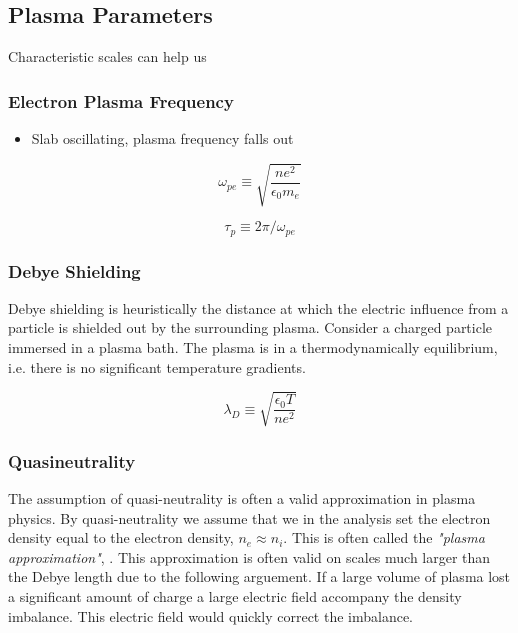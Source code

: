     \subsection{Plasma Parameters}
		\label{sec:parameters}

		Characteristic scales can help us



		\subsubsection{Electron Plasma Frequency}

		\begin{itemize}
			\item Slab oscillating, plasma frequency falls out
		\end{itemize}

		\begin{equation}
			\omega_{pe} \equiv \sqrt{\frac{ne^2}{\epsilon_0 m_e}}
		\end{equation}

		\begin{equation}
			\tau_p \equiv 2\pi/\omega_{pe}
		\end{equation}

		\subsubsection{Debye Shielding}
		Debye shielding is heuristically the distance at which the electric influence
		from a particle is shielded out by the surrounding plasma.
		Consider a charged particle immersed in a plasma bath. The plasma is in
		a thermodynamically equilibrium, i.e. there is no significant temperature
		gradients.



		\begin{equation}
			\lambda_D \equiv \sqrt{\frac{\epsilon_0 T}{n e^2}}
		\end{equation}

		\subsubsection{Quasineutrality}
		The assumption of quasi-neutrality is often a valid approximation in plasma
		physics. By quasi-neutrality we assume that we in the analysis set the electron
		density equal to the electron density, \(n_e \approx n_i\). This is often called the
		\textit{"plasma approximation"}, \citep{chen_introduction_1984}. This approximation is often valid on scales
		much larger than the Debye length due to the following arguement. If a
		large volume of plasma lost a significant amount of charge a large electric
		field accompany the density imbalance. This electric field would quickly correct
		the imbalance.

